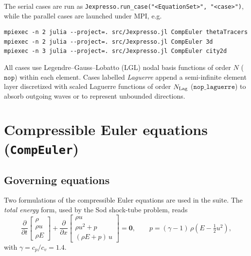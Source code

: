 \documentclass[11pt,a4paper]{article}
\begin{document}
The serial cases are run as
\verb|Jexpresso.run_case("<EquationSet>", "<case>")|, while the parallel
cases are launched under MPI, e.g.
\begin{verbatim}
mpiexec -n 2 julia --project=. src/Jexpresso.jl CompEuler thetaTracers
mpiexec -n 2 julia --project=. src/Jexpresso.jl CompEuler 3d
mpiexec -n 3 julia --project=. src/Jexpresso.jl CompEuler city2d
\end{verbatim}

All cases use Legendre--Gauss--Lobatto (LGL) nodal basis functions of
order $N$ ($\texttt{nop}$) within each element. Cases labelled
\emph{Laguerre} append a semi-infinite element layer discretized with
scaled Laguerre functions of order $N_{\rm Lag}$
($\texttt{nop\_laguerre}$) to absorb outgoing waves or to represent
unbounded directions.

\section{Compressible Euler equations (\texttt{CompEuler})}

\subsection{Governing equations}
Two formulations of the compressible Euler equations are used in the
suite. The \emph{total energy} form, used by the Sod shock-tube problem,
reads
\begin{equation}
  \frac{\partial}{\partial t}
  \begin{bmatrix} \rho \\ \rho u \\ \rho E \end{bmatrix}
  +
  \frac{\partial}{\partial x}
  \begin{bmatrix} \rho u \\ \rho u^2 + p \\ (\rho E + p)\,u \end{bmatrix}
  = \bm{0},
  \qquad
  p = (\gamma - 1)\,\rho\!\left(E - \tfrac{1}{2}u^2\right),
  \label{eq:euler-totalenergy}
\end{equation}
with $\gamma = c_p/c_v = 1.4$.
\end{document}
